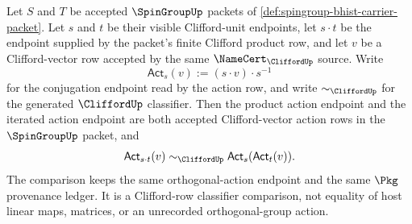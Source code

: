 \begin{theorem}
\label{thm:spingroup-conjugation-action-product-law}
Let $S$ and $T$ be accepted $\SpinGroupUp$ packets of
\autoref{def:spingroup-bhist-carrier-packet}. Let $s$ and $t$ be their visible
Clifford-unit endpoints, let $s\cdot t$ be the endpoint supplied by the
packet's finite Clifford product row, and let $v$ be a Clifford-vector row
accepted by the same $\NameCert_{\CliffordUp}$ source. Write
$$
\mathsf{Act}_{s}(v):=(s\cdot v)\cdot s^{-1}
$$
for the conjugation endpoint read by the action row, and write $\sim_{\CliffordUp}$
for the generated $\CliffordUp$ classifier. Then the product action endpoint
and the iterated action endpoint are both accepted Clifford-vector action rows
in the $\SpinGroupUp$ packet, and
$$
\mathsf{Act}_{s\cdot t}(v)\sim_{\CliffordUp}
\mathsf{Act}_{s}(\mathsf{Act}_{t}(v)).
$$
The comparison keeps the same orthogonal-action endpoint and the same $\Pkg$
provenance ledger. It is a Clifford-row classifier comparison, not equality of
host linear maps, matrices, or an unrecorded orthogonal-group action.
\end{theorem}
